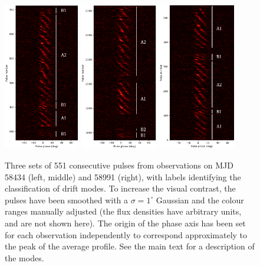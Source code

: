 \documentclass[linenumbers]{aastex631}
\begin{document}
\begin{figure}[!t]
    \centering
    \includegraphics[width=0.2955\textwidth]{1226062160_1024b.png}
    \includegraphics[width=0.3\textwidth]{1226062160_1024.png}
    \includegraphics[width=0.302\textwidth]{1274143152.png}
    \caption{Three sets of 551 consecutive pulses from observations on MJD 58434 (left, middle) and 58991 (right), with labels identifying the classification of drift modes. To increase the visual contrast, the pulses have been smoothed with a $\sigma = 1^\circ$ Gaussian and the colour ranges manually adjusted (the flux densities have arbitrary units, and are not shown here). The origin of the phase axis has been set for each observation independently to correspond approximately to the peak of the average profile. See the main text for a description of the modes.}
    \label{fig:pulsestacks}
\end{figure}
\end{document}
